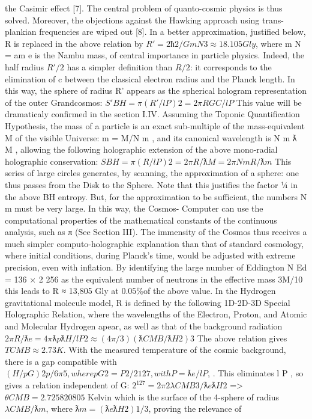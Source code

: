 the Casimir effect [7]. The central problem of quanto-cosmic physics is thus solved. Moreover, the
objections against the Hawking approach using trans-plankian frequencies are wiped out [8].
In a better approximation, justified below, R is replaced in the above relation by $R' = 2ħ2/Gm N3
≈ 18.105 Gly$, where m N = am e is the Nambu mass, of central importance in particle
physics. Indeed, the half radius $R'/2$ has a simpler definition than $R/2$: it corresponds to the
elimination of c between the classical electron radius and the Planck length. In this way, the sphere
of radius R' appears as the spherical hologram representation of the outer Grandcosmos:
$S' BH = π(R'/l P )2 = 2πR GC /l P$
This value will be dramaticaly confirmed in the section I.IV.
Assuming the Toponic Quantification Hypothesis, the mass of a particle is an exact sub-multiple
of the mass-equivalent M of the visible Universe: m = M/N m , and its canonical wavelength is N m ƛ M ,
allowing the following holographic extension of the above mono-radial holographic conservation:
$S BH = π(R/l P )2 = 2πR/ƛ M = 2πN m R/ƛ m$
This series of large circles generates, by scanning, the approximation of a sphere: one thus passes
from the Disk to the Sphere. Note that this justifies the factor 1⁄4 in the above BH entropy. But, for
the approximation to be sufficient, the numbers N m must be very large. In this way, the Cosmos-
Computer can use the computational properties of the mathematical constants of the continuous
analysis, such as π (See Section III).
The immensity of the Cosmos thus receives a much simpler computo-holographic explanation than
that of standard cosmology, where initial conditions, during Planck's time, would be adjusted with
extreme precision, even with inflation. By identifying the large number of Eddington N Ed = 136 ×
2 256 as the equivalent number of neutrons in the effective mass 3M/10 this leads to R ≈ 13,805
Gly at $0.05\%$of the above value.
In the Hydrogen gravitational molecule model, R is defined by the following 1D-2D-3D Special
Holographic Relation, where the wavelengths of the Electron, Proton, and Atomic and Molecular
Hydrogen apear, as well as that of the background radiation
$2πR/ƛ e = 4π ƛ p ƛ H /l P 2 ≈ (4π/3)(ƛ CMB /ƛ H2 ) 3$
The above relation gives $T CMB ≈ 2.73 K$. With the measured temperature of the cosmic
background, there is a gap compatible with $(H/p G ) 2 p/6π 5 , where p G 2 = P 2 /2 127 , with P = ƛ e /l P$, . This
eliminates l P , so gives a relation independent of G:
$2^127 = 2π 2 λ CMB 3 /ƛ e ƛ H 2$
=> $θ CMB = 2.725820805$
Kelvin which is the surface of the 4-sphere of radius $λ CMB /ƛ m$, where $ƛ m = (ƛ e ƛ H 2 ) 1/3 $, proving the relevance of
